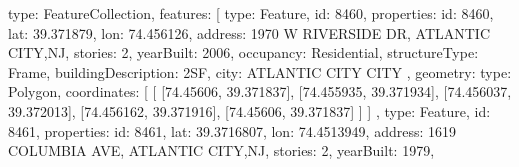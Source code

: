 \documentclass[letterpaper,10pt,english]{sphinxmanual}
\begin{document}
\begin{sphinxVerbatim}[commandchars=\\\{\}]
\PYGZob{}
    \PYGZdq{}type\PYGZdq{}: \PYGZdq{}FeatureCollection\PYGZdq{},
    \PYGZdq{}features\PYGZdq{}: [\PYGZob{}
                    \PYGZdq{}type\PYGZdq{}: \PYGZdq{}Feature\PYGZdq{},
                    \PYGZdq{}id\PYGZdq{}: \PYGZdq{}8460\PYGZdq{},
                    \PYGZdq{}properties\PYGZdq{}: \PYGZob{}
                            \PYGZdq{}id\PYGZdq{}: \PYGZdq{}8460\PYGZdq{},
                            \PYGZdq{}lat\PYGZdq{}: 39.371879,
                            \PYGZdq{}lon\PYGZdq{}: \PYGZhy{}74.456126,
                            \PYGZdq{}address\PYGZdq{}: \PYGZdq{}1970 W RIVERSIDE DR, ATLANTIC CITY,NJ\PYGZdq{},
                            \PYGZdq{}stories\PYGZdq{}: 2,
                            \PYGZdq{}yearBuilt\PYGZdq{}: 2006,
                            \PYGZdq{}occupancy\PYGZdq{}: \PYGZdq{}Residential\PYGZdq{},
                            \PYGZdq{}structureType\PYGZdq{}: \PYGZdq{}Frame\PYGZdq{},
                            \PYGZdq{}buildingDescription\PYGZdq{}: \PYGZdq{}2SF\PYGZdq{},
                            \PYGZdq{}city\PYGZdq{}: \PYGZdq{}ATLANTIC CITY CITY\PYGZdq{}
                    \PYGZcb{},
                    \PYGZdq{}geometry\PYGZdq{}: \PYGZob{}
                            \PYGZdq{}type\PYGZdq{}: \PYGZdq{}Polygon\PYGZdq{},
                            \PYGZdq{}coordinates\PYGZdq{}: [
                                    [
                                            [\PYGZhy{}74.45606, 39.371837],
                                            [\PYGZhy{}74.455935, 39.371934],
                                            [\PYGZhy{}74.456037, 39.372013],
                                            [\PYGZhy{}74.456162, 39.371916],
                                            [\PYGZhy{}74.45606, 39.371837]
                                    ]
                            ]
                    \PYGZcb{}
            \PYGZcb{},
            \PYGZob{}
                    \PYGZdq{}type\PYGZdq{}: \PYGZdq{}Feature\PYGZdq{},
                    \PYGZdq{}id\PYGZdq{}: \PYGZdq{}8461\PYGZdq{},
                    \PYGZdq{}properties\PYGZdq{}: \PYGZob{}
                            \PYGZdq{}id\PYGZdq{}: \PYGZdq{}8461\PYGZdq{},
                            \PYGZdq{}lat\PYGZdq{}: 39.3716807,
                            \PYGZdq{}lon\PYGZdq{}: \PYGZhy{}74.4513949,
                            \PYGZdq{}address\PYGZdq{}: \PYGZdq{}1619 COLUMBIA AVE, ATLANTIC CITY,NJ\PYGZdq{},
                            \PYGZdq{}stories\PYGZdq{}: 2,
                            \PYGZdq{}yearBuilt\PYGZdq{}: 1979,

\end{sphinxVerbatim}
\end{document}
